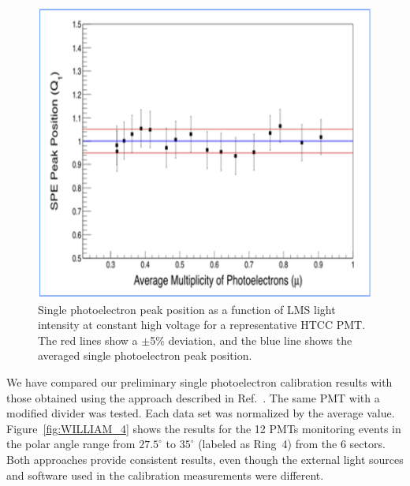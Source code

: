 \begin{figure}[ht]
\centering
\includegraphics[width=0.99\linewidth]{images/WILLIAM_5.png}
\caption{Single photoelectron peak position as a function of LMS light intensity at constant high voltage for a
  representative HTCC PMT. The red lines show a $\pm$5\% deviation, and the blue line shows the averaged
  single photoelectron peak position.}
\label{fig:WILLIAM_5}
\end{figure}

We have compared our preliminary single photoelectron calibration results with those obtained using the
approach described in Ref.~\cite{degtiarenko2017}. The same PMT with a modified divider was tested. Each data
set was normalized by the average value. Figure~\ref{fig:WILLIAM_4} shows the results for the 12 PMTs monitoring
events in the polar angle range from $27.5^\circ$ to $35^\circ$ (labeled as Ring~4) from the 6 sectors. Both approaches
provide consistent results, even though the external light sources and software used in the calibration measurements
were different.

